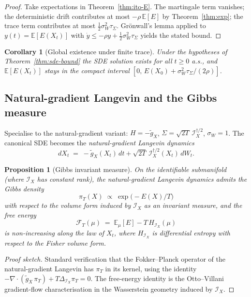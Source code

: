 \documentclass[11pt,oneside]{amsart}
\theoremstyle{plain}
\newtheorem{proposition}[theorem]{Proposition}
\newtheorem{corollary}[theorem]{Corollary}
\theoremstyle{definition}
\newcommand{\gX}{g_X}
\begin{document}
\begin{proof}
Take expectations in Theorem~\ref{thm:ito-E}. The martingale term
vanishes; the deterministic drift contributes at most $-\rho\,\mathbb{E}[E]$
by Theorem~\ref{thm:exp}; the trace term contributes at most
$\tfrac12\sigma_W^2\tau_\Sigma$. Gr\"onwall's lemma applied to
$y(t)=\mathbb{E}[E(X_t)]$ with $\dot y\le -\rho y + \tfrac12\sigma_W^2\tau_\Sigma$
yields the stated bound.
\end{proof}

\begin{corollary}[Global existence under finite trace]
\label{cor:global-sde}
Under the hypotheses of Theorem~\ref{thm:sde-bound} the SDE solution
exists for all $t\ge 0$ a.s., and $\mathbb{E}[E(X_t)]$ stays in the
compact interval $[0,\, E(X_0)+\sigma_W^2\tau_\Sigma/(2\rho)]$.
\end{corollary}

\subsection{Natural-gradient Langevin and the Gibbs measure}

Specialise to the natural-gradient variant: $H=-\widetilde\gX$,
$\Sigma=\sqrt{2T}\,\mathcal{I}_X^{\dagger/2}$, $\sigma_W=1$. The
canonical SDE becomes the \emph{natural-gradient Langevin dynamics}
\[
  dX_t \;=\; -\widetilde\gX(X_t)\,dt + \sqrt{2T}\,\mathcal{I}_X^{\dagger/2}(X_t)\,dW_t.
\]

\begin{proposition}[Gibbs invariant measure]
\label{prop:gibbs}
On the identifiable submanifold (where $\mathcal{I}_X$ has constant
rank), the natural-gradient Langevin dynamics admits the Gibbs
density
\[
  \pi_T(X) \;\propto\; \exp\!\bigl(-E(X)/T\bigr)
\]
with respect to the volume form induced by $\mathcal{I}_X$ as an
invariant measure, and the free energy
\[
  \mathcal F_T(\mu) \;=\; \mathbb E_\mu[E] - T\,H_{\mathcal{I}_X}(\mu)
\]
is non-increasing along the law of $X_t$, where $H_{\mathcal{I}_X}$
is differential entropy with respect to the Fisher volume form.
\end{proposition}

\begin{proof}[Proof sketch]
Standard verification that the Fokker--Planck operator of the
natural-gradient Langevin has $\pi_T$ in its kernel, using the
identity $-\nabla\cdot(\widetilde\gX\,\pi_T) + T\Delta_{\mathcal{I}_X}\pi_T = 0$.
The free-energy identity is the Otto--Villani gradient-flow
characterisation in the Wasserstein geometry induced by
$\mathcal{I}_X$.
\end{proof}
\end{document}
